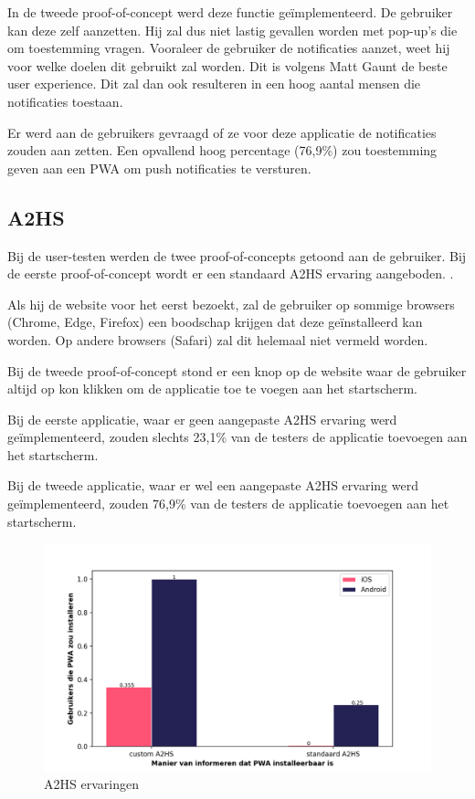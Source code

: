 		In de tweede proof-of-concept werd deze functie geïmplementeerd. De gebruiker kan deze zelf aanzetten. Hij zal dus niet lastig gevallen worden met pop-up's die om toestemming vragen. Vooraleer de gebruiker de notificaties aanzet, weet hij voor welke doelen dit gebruikt zal worden. Dit is volgens Matt Gaunt de beste user experience. Dit zal dan ook resulteren in een hoog aantal mensen die notificaties toestaan. \autocite{Gaunt2019c}
		
		Er werd aan de gebruikers gevraagd of ze voor deze applicatie de notificaties zouden aan zetten. Een opvallend hoog percentage (76,9\%) zou toestemming geven aan een PWA om push notificaties te versturen.
		
		
		
	\subsection{A2HS}
		Bij de user-testen werden de twee proof-of-concepts getoond aan de gebruiker. Bij de eerste proof-of-concept wordt er een standaard A2HS ervaring aangeboden. .
		
		Als hij de website voor het eerst bezoekt, zal de gebruiker op sommige browsers (Chrome, Edge, Firefox) een boodschap krijgen dat deze geïnstalleerd kan worden.  Op andere browsers (Safari) zal dit helemaal niet vermeld worden.
				
		Bij de tweede proof-of-concept stond er een knop op de website waar de gebruiker altijd op kon klikken om de applicatie toe te voegen aan het startscherm. 
		
		Bij de eerste applicatie, waar er geen aangepaste A2HS ervaring werd geïmplementeerd, zouden slechts 23,1\% van de testers de applicatie toevoegen aan het startscherm.  
		
		Bij de tweede applicatie, waar er wel een aangepaste A2HS ervaring werd geïmplementeerd, zouden 76,9\% van de testers de applicatie toevoegen aan het startscherm.
		
		\begin{figure}[H]
			\centering
			\includegraphics[width=120mm]{./img/A2HS_data.png}
			\caption{A2HS ervaringen}
		\end{figure}

